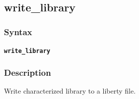 \pagebreak
\subsection*{write_library}
\subsubsection*{Syntax}
\texttt{\textbf{write_library}}\newline
\hspace*{0.5cm}\newline
\subsubsection*{Description}
Write characterized library to a liberty file.